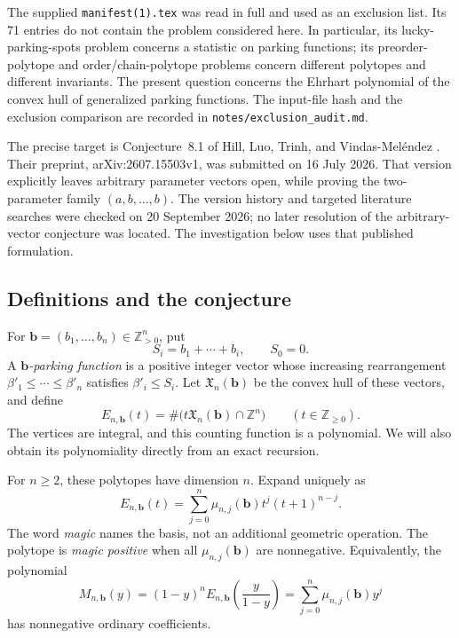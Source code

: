 \documentclass[11pt]{article}
\theoremstyle{definition}
\newcommand{\Z}{\mathbb Z}
\newcommand{\bb}{\mathbf b}
\newcommand{\X}{\mathfrak X}
\numberwithin{equation}{section}
\begin{document}
The supplied \texttt{manifest(1).tex} was read in full and used as an exclusion
list. Its 71 entries do not contain the problem considered here. In particular,
its lucky-parking-spots problem concerns a statistic on parking functions;
its preorder-polytope and order/chain-polytope problems concern different
polytopes and different invariants. The present question concerns the
Ehrhart polynomial of the convex hull of generalized parking functions.
The input-file hash and the exclusion comparison are recorded in
\texttt{notes/exclusion\_audit.md}.

The precise target is Conjecture~8.1 of Hill, Luo, Trinh, and
Vindas-Mel\'endez \cite{HLTV}. Their preprint, arXiv:2607.15503v1, was
submitted on 16 July 2026. That version explicitly leaves arbitrary parameter vectors open,
while proving the two-parameter family $(a,b,\ldots,b)$. The version history
and targeted literature searches were checked on 20 September 2026; no later
resolution of the arbitrary-vector conjecture was located. The investigation below uses that published formulation.

\subsection{Definitions and the conjecture}
For $\bb=(b_1,\ldots,b_n)\in\Z_{>0}^n$, put
\[
 S_i=b_1+\cdots+b_i,\qquad S_0=0.
\]
A \emph{$\bb$-parking function} is a positive integer vector whose increasing
rearrangement $\beta'_1\le\cdots\le\beta'_n$ satisfies $\beta'_i\le S_i$.
Let $\X_n(\bb)$ be the convex hull of these vectors, and define
\[
 E_{n,\bb}(t)=\#\bigl(t\X_n(\bb)\cap\Z^n\bigr)
 \qquad(t\in\Z_{\ge0}).
\]
The vertices are integral, and this counting function is a polynomial. We
will also obtain its polynomiality directly from an exact recursion.

For $n\ge2$, these polytopes have dimension $n$. Expand uniquely as
\begin{equation}
 E_{n,\bb}(t)=\sum_{j=0}^n\mu_{n,j}(\bb)t^j(t+1)^{n-j}.
 \label{eq:magic-basis}
\end{equation}
The word \emph{magic} names the basis, not an additional geometric operation.
The polytope is \emph{magic positive} when all $\mu_{n,j}(\bb)$ are
nonnegative. Equivalently, the polynomial
\begin{equation}
 M_{n,\bb}(y)=(1-y)^n E_{n,\bb}\!\left(\frac{y}{1-y}\right)
       =\sum_{j=0}^n\mu_{n,j}(\bb)y^j
 \label{eq:transform}
\end{equation}
has nonnegative ordinary coefficients.
\end{document}
